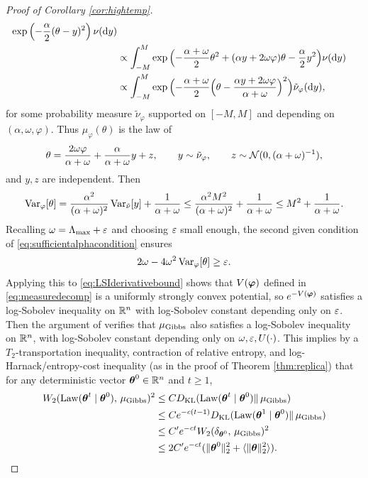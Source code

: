 \begin{proof}[Proof of Corollary \ref{cor:hightemp}]
\begin{align*}
\exp\left({-}\frac{\alpha}{2}(\theta-y)^2\right)\nu(\mathrm{d} y)\\
&\propto \int_{-M}^M
\exp\Big({-}\frac{\alpha+\omega}{2}\theta^2
+(\alpha y+2\omega \varphi)\theta-\frac{\alpha}{2}y^2\Big)\nu(\mathrm{d} y)\\
&\propto \int_{-M}^M \exp\Big({-}\frac{\alpha+\omega}{2}
\Big(\theta-\frac{\alpha y+2\omega \varphi}{\alpha+\omega}\Big)^2\Big)
\tilde \nu_\varphi(\mathrm{d} y),
\end{align*}
for some probability measure $\tilde \nu_\varphi$ supported on $[-M,M]$ and
depending on $(\alpha,\omega,\varphi)$. Thus $\mu_\varphi(\theta)$
is the law of 
\[\theta=\frac{2\omega\varphi}{\alpha+\omega}
+\frac{\alpha}{\alpha+\omega}y+z,
\qquad y \sim \tilde \nu_\varphi,
\qquad z \sim \mathcal{N}(0,(\alpha+\omega)^{-1}),\]
and $y,z$ are independent. Then
\[\operatorname{Var}_\varphi[\theta]
=\frac{\alpha^2}{(\alpha+\omega)^2}\operatorname{Var}_{\tilde \nu}[y]
+\frac{1}{\alpha+\omega}
\leq \frac{\alpha^2M^2}{(\alpha+\omega)^2}+\frac{1}{\alpha+\omega}
\leq M^2+\frac{1}{\alpha+\omega}.\]
Recalling $\omega=\Lambda_{\max}+\varepsilon$ and choosing $\varepsilon$ small enough, the
second given condition of \eqref{eq:sufficientalphacondition} ensures
\[2\omega-4\omega^2\operatorname{Var}_\varphi[\theta] \geq \varepsilon.\]
Applying this to \eqref{eq:LSIderivativebound} shows that
$V(\boldsymbol{\varphi})$ defined in \eqref{eq:measuredecomp} is a
uniformly strongly convex potential, so $e^{-V(\boldsymbol{\varphi})}$
satisfies a log-Sobolev inequality on $\mathbb{R}^n$ with log-Sobolev constant depending
only on $\varepsilon$. Then the argument of \cite{bauerschmidt2019very} verifies that
$\mu_{\mathrm{Gibbs}}$ also satisfies a log-Sobolev inequality on $\mathbb{R}^n$, with
log-Sobolev constant depending only on $\omega,\varepsilon,U(\cdot)$.
This implies by a $T_2$-transportation inequality, contraction of relative
entropy, and log-Harnack/entropy-cost inequality (as in the proof of Theorem \ref{thm:replica}) that for any
deterministic vector $\boldsymbol{\theta}^0 \in \mathbb{R}^n$ and $t \geq 1$,
\begin{align*}
W_2(\operatorname{Law}(\boldsymbol{\theta}^t \mid \boldsymbol{\theta}^0),\,\mu_{\mathrm{Gibbs}})^2
&\leq CD_{\mathrm{KL}}(\operatorname{Law}(\boldsymbol{\theta}^t \mid \boldsymbol{\theta}^0)\|\,\mu_{\mathrm{Gibbs}})\\
&\leq Ce^{-c(t-1)}D_{\mathrm{KL}}(\operatorname{Law}(\boldsymbol{\theta}^1 \mid \boldsymbol{\theta}^0)\|\,\mu_{\mathrm{Gibbs}})\\
&\leq C'e^{-ct}W_2(\delta_{\boldsymbol{\theta}^0},\,\mu_{\mathrm{Gibbs}})^2\\
&\leq 2C'e^{-ct}(\|\boldsymbol{\theta}^0\|_2^2+\langle \|\boldsymbol{\theta}\|_2^2 \rangle).
\end{align*}


\end{proof}
